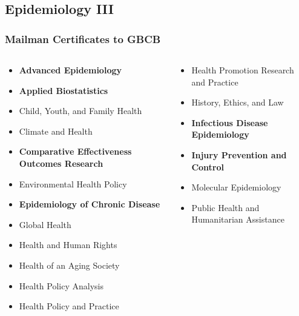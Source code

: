 \documentclass[compress]{beamer}
\begin{document}
\subsection[Epidemiology III]{Epidemiology III}
    \begin{frame}[Basic2] \frametitle{Mailman Certificates to GBCB}
        \begin{columns}
            \begin{column}{0.5\textwidth}
                \begin{itemize}
                    \tiny
                    \item \textbf{Advanced Epidemiology}
                    \item \textbf{Applied Biostatistics}
                    \item Child, Youth, and Family Health
                    \item Climate and Health
                    \item \textbf{Comparative Effectiveness Outcomes Research}
                    \item Environmental Health Policy
                    \item \textbf{Epidemiology of Chronic Disease}
                    \item Global Health
                    \item Health and Human Rights
                    \item Health of an Aging Society
                    \item Health Policy Analysis
                    \item Health Policy and Practice
                \end{itemize}
            \end{column}
            \begin{column}{0.5\textwidth}
                \begin{itemize}
                    \tiny
                    \item Health Promotion Research and Practice
                    \item History, Ethics, and Law
                    \item \textbf{Infectious Disease Epidemiology}
                    \item \textbf{Injury Prevention and Control}
                    \item Molecular Epidemiology
                    \item Public Health and Humanitarian Assistance

\end{itemize}
\end{column}
\end{columns}
\end{frame}
\end{document}
